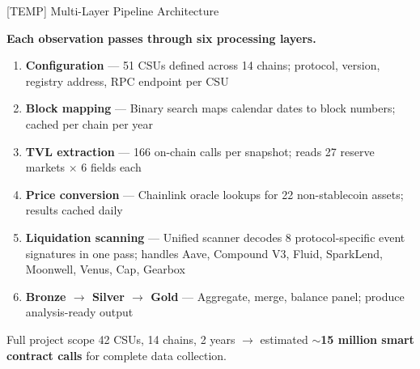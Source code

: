 \begin{frame}{[TEMP] Multi-Layer Pipeline Architecture}

\textbf{Each observation passes through six processing layers.}

\vspace{0.3cm}

\begin{enumerate}
    \item \textbf{Configuration} --- 51 CSUs defined across 14 chains; protocol, version, registry address, RPC endpoint per CSU
    \item \textbf{Block mapping} --- Binary search maps calendar dates to block numbers; cached per chain per year
    \item \textbf{TVL extraction} --- 166 on-chain calls per snapshot; reads 27 reserve markets $\times$ 6 fields each
    \item \textbf{Price conversion} --- Chainlink oracle lookups for 22 non-stablecoin assets; results cached daily
    \item \textbf{Liquidation scanning} --- Unified scanner decodes 8 protocol-specific event signatures in one pass; handles Aave, Compound V3, Fluid, SparkLend, Moonwell, Venus, Cap, Gearbox
    \item \textbf{Bronze $\to$ Silver $\to$ Gold} --- Aggregate, merge, balance panel; produce analysis-ready output
\end{enumerate}

\vspace{0.2cm}

\begin{block}{Full project scope}
42 CSUs, 14 chains, 2 years $\rightarrow$ estimated \textbf{$\sim$15 million smart contract calls} for complete data collection.
\end{block}

\end{frame}


